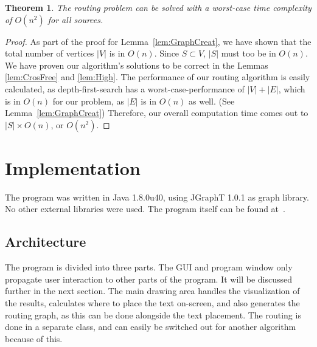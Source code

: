 \documentclass[11pt,a4paper]{vutinfth}
\newtheorem{theorem}{Theorem}
\begin{document}
\begin{theorem}
	The routing problem can be solved with a worst-case time complexity of $O(n^2)$ for all sources.
\end{theorem}
\begin{proof}
	As part of the proof for Lemma~\ref{lem:GraphCreat}, we have shown that the total number of vertices $|V|$ is in $O(n)$. Since $S \subset V$, $|S|$ must too be in $O(n)$. 
	We have proven our algorithm's solutions to be correct in the Lemmas \ref{lem:CrosFree} and \ref{lem:High}.
	The performance of our routing algorithm is easily calculated, as depth-first-search has a worst-case-performance of $|V|+|E|$, which is in $O(n)$ for our problem, as $|E|$ is in $O(n)$ as well. (See Lemma~\ref{lem:GraphCreat})
	Therefore, our overall computation time comes out to $|S| \times O(n)$, or $O(n^2)$.
\end{proof}


\chapter{Implementation}
The program was written in Java 1.8.0u40, using JGraphT 1.0.1\cite{JGraphT} as graph library. No other external libraries were used.
The program itself can be found at~\cite{Program}.

\section{Architecture}
The program is divided into three parts. The GUI and program window only propagate user interaction to other parts of the program. It will be discussed further in the next section.
The main drawing area handles the visualization of the results, calculates where to place the text on-screen, and also generates the routing graph, as this can be done alongside the text placement.
The routing is done in a separate class, and can easily be switched out for another algorithm because of this.
\end{document}
